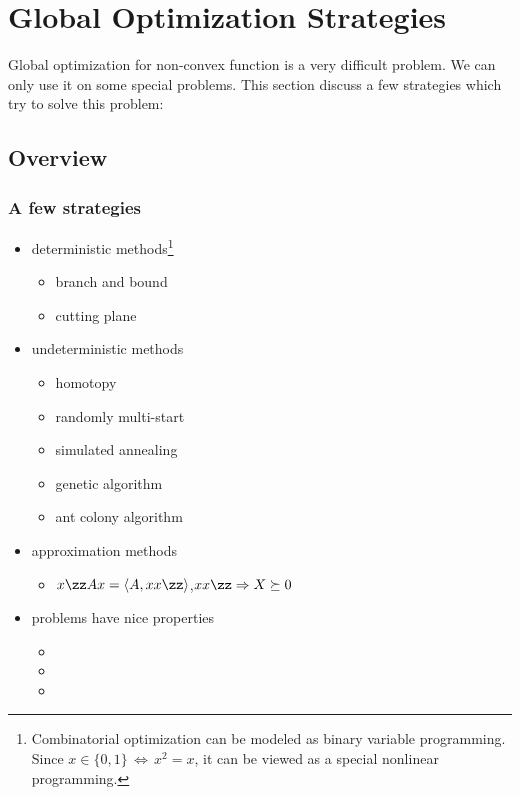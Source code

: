 \section{Global Optimization Strategies}
\iffalse
\begin{frame}
	\begin{center}
		\huge\color{blue}\bf
		Section 3. Global Optimization Strategies
	\end{center}
\end{frame}
\fi
Global optimization for non-convex function is a very difficult problem. We can only use it on some special problems. This section discuss a few strategies which try to solve this problem:
\subsection{Overview}
	\subsubsection{A few strategies}
	\begin{itemize}
		\item deterministic methods\footnote{Combinatorial optimization
			can be modeled as binary variable programming. Since $x\in\{0,1\}\,\Leftrightarrow\, x^2=x$,
			it can be viewed as a special nonlinear programming.}
		\begin{itemize}
			\item branch and bound
			\item cutting plane
			
		\end{itemize}
		\item undeterministic methods
		\begin{itemize}
			\item homotopy
			\item randomly multi-start
			\item simulated annealing
			\item {genetic algorithm}
			\item {ant colony algorithm}
		\end{itemize}
		\item approximation methods
		\begin{itemize}
			\item {} $x\zz Ax=\langle A,xx\zz \rangle$,\quad $xx\zz \Rightarrow X\succeq 0$
		\end{itemize}
		\item problems have nice properties
		\begin{itemize}
			\item {}
			\item {}
			\item {}
		\end{itemize}
	\end{itemize}


